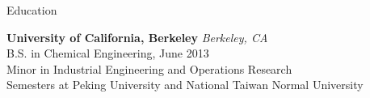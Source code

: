\documentclass{resume} %
\begin{document}
\begin{rSection}{Education}

{\bf University of California, Berkeley} \hfill {\em Berkeley, CA} \\
B.S. in Chemical Engineering, June 2013 \\
Minor in Industrial Engineering and Operations Research \\
Semesters at Peking University and National Taiwan Normal University \smallskip




\end{rSection}






\end{document}
